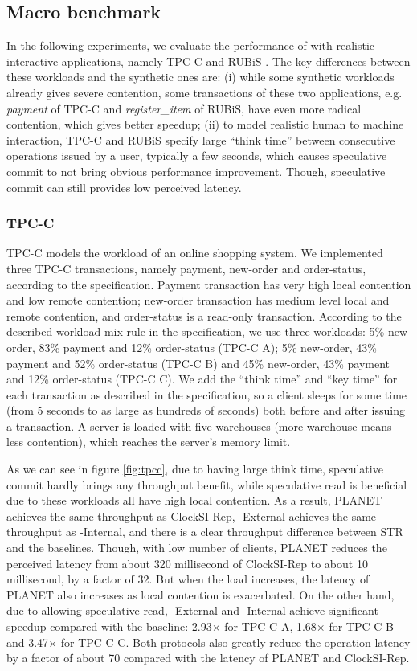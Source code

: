 \subsection{Macro benchmark}
In the following experiments, we evaluate the performance of \specula with realistic interactive applications, namely TPC-C\cite{tpcc} and RUBiS \cite{rubis}. The key differences between these workloads and the synthetic ones are: (i) while some synthetic workloads already gives severe contention, some transactions of these two applications, e.g. \textit{payment} of TPC-C and \textit{register\_item} of RUBiS, have even more radical contention, which gives \specula better speedup; (ii) to model realistic human to machine interaction, TPC-C and RUBiS specify large ``think time'' between consecutive operations issued by a user, typically a few seconds, which causes speculative commit to not bring obvious performance improvement. Though, speculative commit can still provides low perceived latency.

\subsubsection{TPC-C}
TPC-C \cite{tpcc} models the workload of an online shopping system. We implemented three TPC-C transactions, namely payment, new-order and order-status, according to the specification. Payment transaction has very high local contention and low remote contention; new-order transaction has medium level local and remote contention, and order-status is a read-only transaction. According to the described workload mix rule in the specification, we use three workloads: 5\% new-order, 83\% payment and 12\% order-status (TPC-C A); 5\% new-order, 43\% payment and 52\% order-status (TPC-C B) and 45\% new-order, 43\% payment and 12\% order-status (TPC-C C). We add the ``think time'' and ``key time'' for each transaction as described in the specification, so a client sleeps for some time (from 5 seconds to as large as hundreds of seconds) both before and after issuing a transaction. A server is loaded with five warehouses (more warehouse means less contention), which reaches the server's memory limit.

As we can see in figure \ref{fig:tpcc}, due to having large think time, speculative commit hardly brings any throughput benefit, while speculative read is beneficial due to these workloads all have high local contention. As a result, PLANET achieves the same throughput as ClockSI-Rep, {\specula}-External achieves the same throughput as {\specula}-Internal, and there is a clear throughput difference between STR and the baselines. Though, with low number of clients, PLANET reduces the perceived latency from about 320 millisecond of ClockSI-Rep to about 10 millisecond, by a factor of 32. But when the load increases, the latency of PLANET also increases as local contention is exacerbated. On the other hand, due to allowing speculative read, {\specula}-External and {\specula-Internal} achieve significant speedup compared with the baseline: 2.93$\times$ for TPC-C A, 1.68$\times$ for TPC-C B and 3.47$\times$ for TPC-C C. Both {\specula} protocols also greatly reduce the operation latency by a factor of about 70 compared with the latency of PLANET and ClockSI-Rep.

